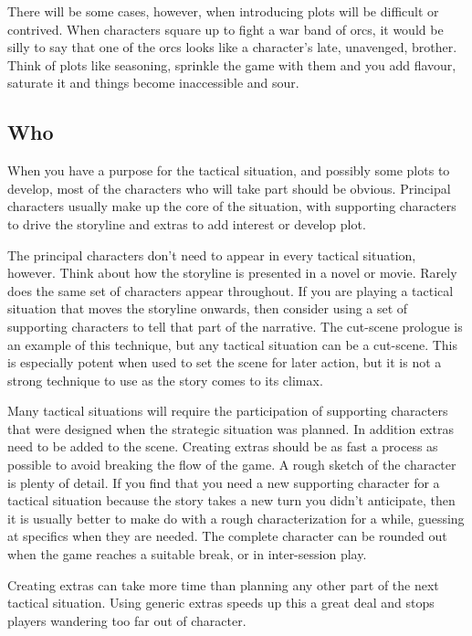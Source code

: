 \documentclass[twoside]{book}
\begin{document}
There will be some cases, however, when introducing plots will be
difficult or contrived. When characters square up to fight a war band
of orcs, it would be silly to say that one of the orcs looks like a
character's late, unavenged, brother. Think of plots like seasoning,
sprinkle the game with them and you add flavour, saturate it and
things become inaccessible and sour.

\subsection{Who}

When you have a purpose for the tactical situation, and possibly some
plots to develop, most of the characters who will take part should be
obvious. Principal characters usually make up the core of the
situation, with supporting characters to drive the storyline and
extras to add interest or develop plot.

The principal characters don't need to appear in every tactical
situation, however. Think about how the storyline is presented in a
novel or movie. Rarely does the same set of characters appear
throughout. If you are playing a tactical situation that moves the
storyline onwards, then consider using a set of supporting characters
to tell that part of the narrative. The cut-scene prologue is an
example of this technique, but any tactical situation can be a
cut-scene. This is especially potent when used to set the scene for
later action, but it is not a strong technique to use as the story
comes to its climax.

Many tactical situations will require the participation of supporting
characters that were designed when the strategic situation was
planned. In addition extras need to be added to the scene. Creating
extras should be as fast a process as possible to avoid breaking the
flow of the game. A rough sketch of the character is plenty of
detail. If you find that you need a new supporting character for a
tactical situation because the story takes a new turn you didn't
anticipate, then it is usually better to make do with a rough
characterization for a while, guessing at specifics when they are
needed. The complete character can be rounded out when the game
reaches a suitable break, or in inter-session play.

Creating extras can take more time than planning any other part of the
next tactical situation. Using generic extras speeds up this a great
deal and stops players wandering too far out of character.
\end{document}

